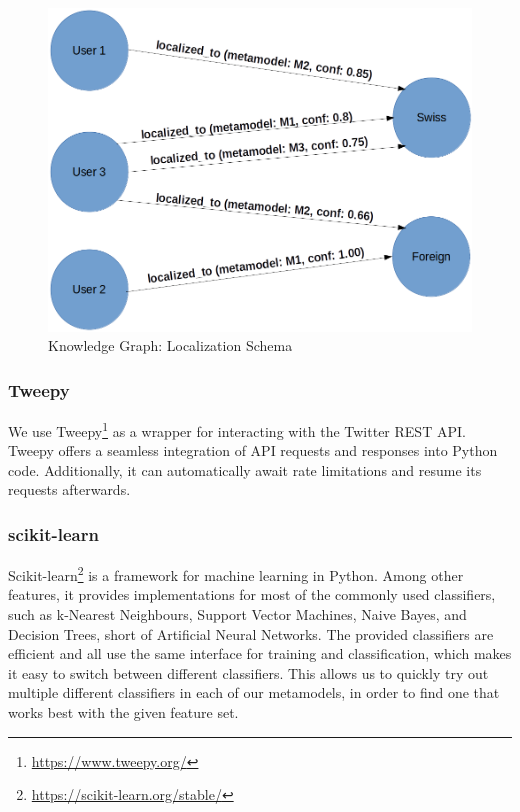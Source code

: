 \documentclass[10pt,a4paper]{article}
\begin{document}
\begin{figure}
	\centering
	\includegraphics[scale=0.30]{knowledge-graph-schema}
	\caption{Knowledge Graph: Localization Schema}
	\label{fig:knowledge-graph-schema}
\end{figure}

\subsubsection{Tweepy}
We use Tweepy\footnote{\href{https://www.tweepy.org/}{https://www.tweepy.org/}} as a wrapper for interacting with the Twitter REST API. Tweepy offers a seamless integration of API requests and responses into Python code. Additionally, it can automatically await rate limitations and resume its requests afterwards. 

\subsubsection{scikit-learn}
Scikit-learn\footnote{\href{https://scikit-learn.org/stable/}{https://scikit-learn.org/stable/}} is a framework for machine learning in Python. Among other features, it provides implementations for most of the commonly used classifiers, such as k-Nearest Neighbours, Support Vector Machines, Naive Bayes, and Decision Trees, short of Artificial Neural Networks. The provided classifiers are efficient and all use the same interface for training and classification, which makes it easy to switch between different classifiers. This allows us to quickly try out multiple different classifiers in each of our metamodels, in order to find one that works best with the given feature set.
\end{document}

